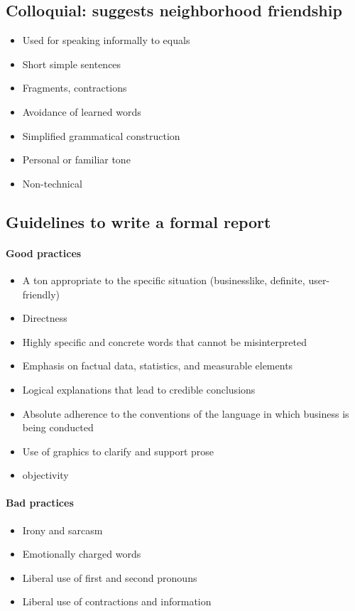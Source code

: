 \documentclass[10pt, twocolumn]{article}
\begin{document}
\subsection{Colloquial: suggests neighborhood friendship}
\begin{itemize}
  \item Used for speaking informally to equals
  \item Short simple sentences
  \item Fragments, contractions
  \item Avoidance of learned words
  \item Simplified grammatical construction
  \item Personal or familiar tone
  \item Non-technical
\end{itemize}


\subsection{Guidelines to write a formal report}
\paragraph{Good practices}
\begin{itemize}
  \item A ton appropriate to the specific situation (businesslike, definite, user-friendly)
  \item Directness
  \item Highly specific and concrete words that cannot be misinterpreted
  \item Emphasis on factual data, statistics, and measurable elements
  \item Logical explanations that lead to credible conclusions
  \item Absolute adherence to the conventions of the language in which business is being conducted
  \item Use of graphics to clarify and support prose
  \item objectivity
\end{itemize}


\paragraph{Bad practices}
\begin{itemize}
  \item Irony and sarcasm
  \item Emotionally charged words
  \item Liberal use of first and second pronouns
  \item Liberal use of contractions and information
\end{itemize}
\end{document}
